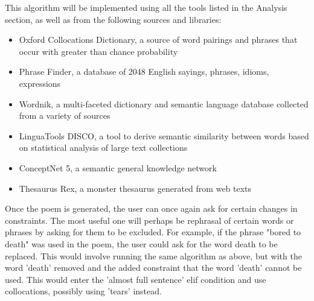 This algorithm will be implemented using all the tools listed in the Analysis section, as well as from the following sources and libraries:
\begin{itemize}
\setlength{\itemsep}{0pt}
\item{Oxford Collocations Dictionary, a source of word pairings and phrases that occur with greater than chance probability}
\item{Phrase Finder, a database of 2048 English sayings, phrases, idioms, expressions}
\item{Wordnik, a multi-faceted dictionary and semantic language database collected from a variety of sources}
\item{LinguaTools DISCO, a tool to derive semantic similarity between words based on statistical analysis of large text collections}
\item{ConceptNet 5, a semantic general knowledge network}
\item{Thesaurus Rex, a monster thesaurus generated from web texts}
\end{itemize}

Once the poem is generated, the user can once again ask for certain changes in constraints. The most useful one will perhaps be rephrasal of certain words or phrases by asking for them to be excluded. For example, if the phrase "bored to death" was used in the poem, the user could ask for the word death to be replaced. This would involve running the same algorithm as above, but with the word 'death' removed and the added constraint that the word 'death' cannot be used. This would enter the 'almost full sentence' elif condition and use collocations, possibly using 'tears' instead.



